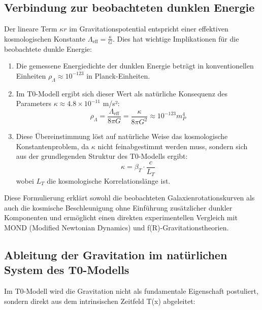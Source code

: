\documentclass[12pt,a4paper]{article}
\begin{document}
	\subsection*{Verbindung zur beobachteten dunklen Energie}
	
	Der lineare Term $\kappa r$ im Gravitationspotential entspricht einer effektiven kosmologischen Konstante $\Lambda_{\text{eff}} = \frac{\kappa}{G}$. Dies hat wichtige Implikationen für die beobachtete dunkle Energie:
	
	\begin{enumerate}
		\item Die gemessene Energiedichte der dunklen Energie beträgt in konventionellen Einheiten $\rho_\Lambda \approx 10^{-123}$ in Planck-Einheiten.
		
		\item Im T0-Modell ergibt sich dieser Wert als natürliche Konsequenz des Parameters $\kappa \approx 4.8 \times 10^{-11}$ m/s²:
		\[
		\rho_\Lambda = \frac{\Lambda_{\text{eff}}}{8\pi G} = \frac{\kappa}{8\pi G^2} \approx 10^{-123} m_P^4
		\]
		
		\item Diese Übereinstimmung löst auf natürliche Weise das kosmologische Konstantenproblem, da $\kappa$ nicht feinabgestimmt werden muss, sondern sich aus der grundlegenden Struktur des T0-Modells ergibt:
		\[
		\kappa = \beta_T \cdot \frac{c}{L_T}
		\]
		wobei $L_T$ die kosmologische Korrelationslänge ist.
	\end{enumerate}
	
	Diese Formulierung erklärt sowohl die beobachteten Galaxienrotationskurven als auch die kosmische Beschleunigung ohne Einführung zusätzlicher dunkler Komponenten und ermöglicht einen direkten experimentellen Vergleich mit MOND (Modified Newtonian Dynamics) und f(R)-Gravitationstheorien.
	
	\subsection*{Ableitung der Gravitation im natürlichen System des T0-Modells}
	
	Im T0-Modell wird die Gravitation nicht als fundamentale Eigenschaft postuliert, sondern direkt aus dem intrinsischen Zeitfeld T(x) abgeleitet:
	
\end{document}
